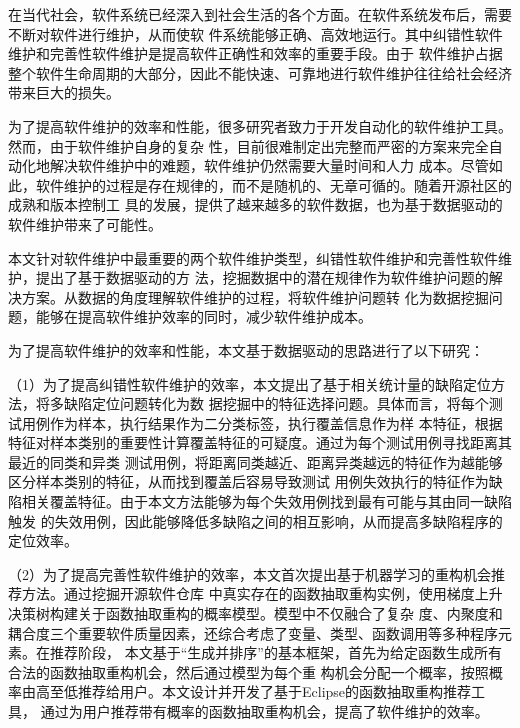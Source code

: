 

\begin{zhaiyao}

在当代社会，软件系统已经深入到社会生活的各个方面。在软件系统发布后，需要不断对软件进行维护，从而使软
件系统能够正确、高效地运行。其中纠错性软件维护和完善性软件维护是提高软件正确性和效率的重要手段。由于
软件维护占据整个软件生命周期的大部分，因此不能快速、可靠地进行软件维护往往给社会经济带来巨大的损失。

为了提高软件维护的效率和性能，很多研究者致力于开发自动化的软件维护工具。然而，由于软件维护自身的复杂
性，目前很难制定出完整而严密的方案来完全自动化地解决软件维护中的难题，软件维护仍然需要大量时间和人力
成本。尽管如此，软件维护的过程是存在规律的，而不是随机的、无章可循的。随着开源社区的成熟和版本控制工
具的发展，提供了越来越多的软件数据，也为基于数据驱动的软件维护带来了可能性。

本文针对软件维护中最重要的两个软件维护类型，纠错性软件维护和完善性软件维护，提出了基于数据驱动的方
法，挖掘数据中的潜在规律作为软件维护问题的解决方案。从数据的角度理解软件维护的过程，将软件维护问题转
化为数据挖掘问题，能够在提高软件维护效率的同时，减少软件维护成本。

为了提高软件维护的效率和性能，本文基于数据驱动的思路进行了以下研究：

（1）为了提高纠错性软件维护的效率，本文提出了基于相关统计量的缺陷定位方法，将多缺陷定位问题转化为数
据挖掘中的特征选择问题。具体而言，将每个测试用例作为样本，执行结果作为二分类标签，执行覆盖信息作为样
本特征，根据特征对样本类别的重要性计算覆盖特征的可疑度。通过为每个测试用例寻找距离其最近的同类和异类
测试用例，将距离同类越近、距离异类越远的特征作为越能够区分样本类别的特征，从而找到覆盖后容易导致测试
用例失效执行的特征作为缺陷相关覆盖特征。由于本文方法能够为每个失效用例找到最有可能与其由同一缺陷触发
的失效用例，因此能够降低多缺陷之间的相互影响，从而提高多缺陷程序的定位效率。

（2）为了提高完善性软件维护的效率，本文首次提出基于机器学习的重构机会推荐方法。通过挖掘开源软件仓库
中真实存在的函数抽取重构实例，使用梯度上升决策树构建关于函数抽取重构的概率模型。模型中不仅融合了复杂
度、内聚度和耦合度三个重要软件质量因素，还综合考虑了变量、类型、函数调用等多种程序元素。在推荐阶段，
本文基于``生成并排序''的基本框架，首先为给定函数生成所有合法的函数抽取重构机会，然后通过模型为每个重
构机会分配一个概率，按照概率由高至低推荐给用户。本文设计并开发了基于Eclipse的函数抽取重构推荐工具，
通过为用户推荐带有概率的函数抽取重构机会，提高了软件维护的效率。


\end{zhaiyao}
